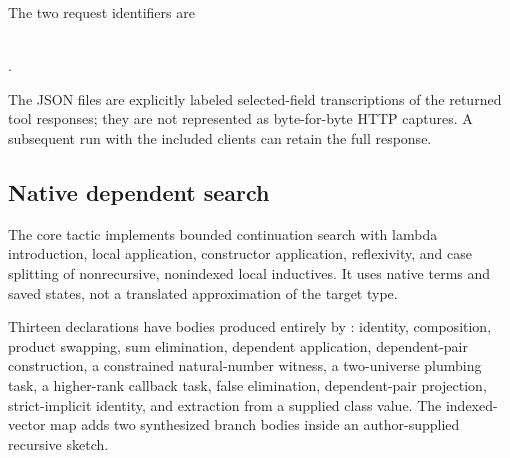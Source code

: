 The two request identifiers are
\begin{center}\small
{}\\
.
\end{center}
The JSON files are explicitly labeled selected-field transcriptions of the returned tool responses; they are not represented as byte-for-byte HTTP captures. A subsequent run with the included clients can retain the full response.

\subsection{Native dependent search}

The core tactic implements bounded continuation search with lambda introduction, local application, constructor application, reflexivity, and case splitting of nonrecursive, nonindexed local inductives. It uses native terms and saved states, not a translated approximation of the target type.

Thirteen declarations have bodies produced entirely by : identity, composition, product swapping, sum elimination, dependent application, dependent-pair construction, a constrained natural-number witness, a two-universe plumbing task, a higher-rank callback task, false elimination, dependent-pair projection, strict-implicit identity, and extraction from a supplied class value. The indexed-vector map adds two synthesized branch bodies inside an author-supplied recursive sketch.

